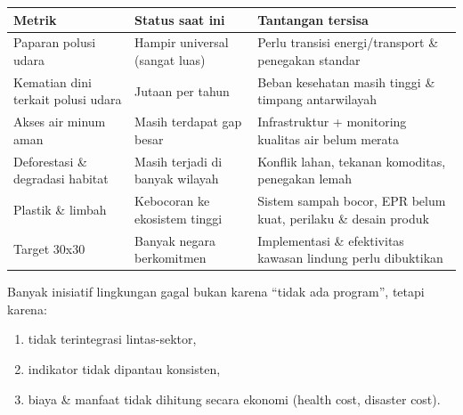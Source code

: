 \documentclass[
  letterpaper,
  DIV=11,
  numbers=noendperiod]{scrreprt}
\providecommand{\tightlist}{%
  \setlength{\itemsep}{0pt}\setlength{\parskip}{0pt}}
\begin{document}
\begin{longtable}[]{@{}
  >{\raggedright\arraybackslash}p{}
  >{\raggedright\arraybackslash}p{}
  >{\raggedright\arraybackslash}p{}@{}}
\toprule\noalign{}
\begin{minipage}[b]{\linewidth}\raggedright
Metrik
\end{minipage} & \begin{minipage}[b]{\linewidth}\raggedright
Status saat ini
\end{minipage} & \begin{minipage}[b]{\linewidth}\raggedright
Tantangan tersisa
\end{minipage} \\
\midrule\noalign{}
\endhead
\bottomrule\noalign{}
\endlastfoot
Paparan polusi udara & Hampir universal (sangat luas) & Perlu transisi
energi/transport \& penegakan standar \\
Kematian dini terkait polusi udara & Jutaan per tahun & Beban kesehatan
masih tinggi \& timpang antarwilayah \\
Akses air minum aman & Masih terdapat gap besar & Infrastruktur +
monitoring kualitas air belum merata \\
Deforestasi \& degradasi habitat & Masih terjadi di banyak wilayah &
Konflik lahan, tekanan komoditas, penegakan lemah \\
Plastik \& limbah & Kebocoran ke ekosistem tinggi & Sistem sampah bocor,
EPR belum kuat, perilaku \& desain produk \\
Target 30x30 & Banyak negara berkomitmen & Implementasi \& efektivitas
kawasan lindung perlu dibuktikan \\
\end{longtable}

\begin{tcolorbox}[enhanced jigsaw, colback=white, colframe=quarto-callout-warning-color-frame, left=2mm, arc=.35mm, bottomrule=.15mm, opacityback=0, opacitybacktitle=0.6, coltitle=black, toprule=.15mm, colbacktitle=quarto-callout-warning-color!10!white, breakable, titlerule=0mm, leftrule=.75mm, title=\textcolor{quarto-callout-warning-color}{\faExclamationTriangle}\hspace{0.5em}{Evaluasi Kritis}, toptitle=1mm, bottomtitle=1mm, rightrule=.15mm]

Banyak inisiatif lingkungan gagal bukan karena ``tidak ada program'',
tetapi karena:

\begin{enumerate}
\def\labelenumi{\arabic{enumi})}
\tightlist
\item
  tidak terintegrasi lintas-sektor,\\
\item
  indikator tidak dipantau konsisten,\\
\item
  biaya \& manfaat tidak dihitung secara ekonomi (health cost, disaster
  cost).
\end{enumerate}

\end{tcolorbox}
\end{document}
